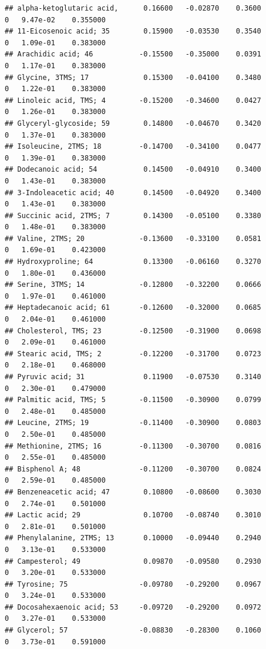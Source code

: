 \documentclass[]{article}
\begin{document}
\begin{verbatim}
## alpha-ketoglutaric acid,      0.16600   -0.02870    0.3600         0   9.47e-02    0.355000
## 11-Eicosenoic acid; 35        0.15900   -0.03530    0.3540         0   1.09e-01    0.383000
## Arachidic acid; 46           -0.15500   -0.35000    0.0391         0   1.17e-01    0.383000
## Glycine, 3TMS; 17             0.15300   -0.04100    0.3480         0   1.22e-01    0.383000
## Linoleic acid, TMS; 4        -0.15200   -0.34600    0.0427         0   1.26e-01    0.383000
## Glyceryl-glycoside; 59        0.14800   -0.04670    0.3420         0   1.37e-01    0.383000
## Isoleucine, 2TMS; 18         -0.14700   -0.34100    0.0477         0   1.39e-01    0.383000
## Dodecanoic acid; 54           0.14500   -0.04910    0.3400         0   1.43e-01    0.383000
## 3-Indoleacetic acid; 40       0.14500   -0.04920    0.3400         0   1.43e-01    0.383000
## Succinic acid, 2TMS; 7        0.14300   -0.05100    0.3380         0   1.48e-01    0.383000
## Valine, 2TMS; 20             -0.13600   -0.33100    0.0581         0   1.69e-01    0.423000
## Hydroxyproline; 64            0.13300   -0.06160    0.3270         0   1.80e-01    0.436000
## Serine, 3TMS; 14             -0.12800   -0.32200    0.0666         0   1.97e-01    0.461000
## Heptadecanoic acid; 61       -0.12600   -0.32000    0.0685         0   2.04e-01    0.461000
## Cholesterol, TMS; 23         -0.12500   -0.31900    0.0698         0   2.09e-01    0.461000
## Stearic acid, TMS; 2         -0.12200   -0.31700    0.0723         0   2.18e-01    0.468000
## Pyruvic acid; 31              0.11900   -0.07530    0.3140         0   2.30e-01    0.479000
## Palmitic acid, TMS; 5        -0.11500   -0.30900    0.0799         0   2.48e-01    0.485000
## Leucine, 2TMS; 19            -0.11400   -0.30900    0.0803         0   2.50e-01    0.485000
## Methionine, 2TMS; 16         -0.11300   -0.30700    0.0816         0   2.55e-01    0.485000
## Bisphenol A; 48              -0.11200   -0.30700    0.0824         0   2.59e-01    0.485000
## Benzeneacetic acid; 47        0.10800   -0.08600    0.3030         0   2.74e-01    0.501000
## Lactic acid; 29               0.10700   -0.08740    0.3010         0   2.81e-01    0.501000
## Phenylalanine, 2TMS; 13       0.10000   -0.09440    0.2940         0   3.13e-01    0.533000
## Campesterol; 49               0.09870   -0.09580    0.2930         0   3.20e-01    0.533000
## Tyrosine; 75                 -0.09780   -0.29200    0.0967         0   3.24e-01    0.533000
## Docosahexaenoic acid; 53     -0.09720   -0.29200    0.0972         0   3.27e-01    0.533000
## Glycerol; 57                 -0.08830   -0.28300    0.1060         0   3.73e-01    0.591000

\end{verbatim}
\end{document}
